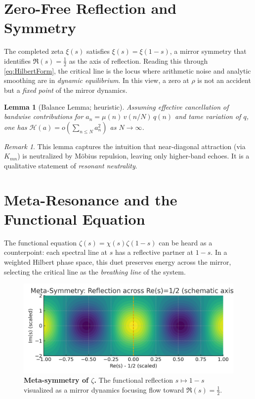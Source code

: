 \documentclass[11pt]{article}
\newtheorem{lemma}{Lemma}
\theoremstyle{remark}
\newtheorem{remark}{Remark}
\begin{document}
\section{Zero-Free Reflection and Symmetry}
The completed zeta $\xi(s)$ satisfies $\xi(s)=\xi(1-s)$, a mirror symmetry that identifies $\Re(s)=\tfrac12$ as the axis of reflection.
Reading this through \eqref{eq:HilbertForm}, the critical line is the locus where arithmetic noise and analytic smoothing are in \emph{dynamic equilibrium}. In this view, a zero at $\rho$ is not an accident but a \emph{fixed point} of the mirror dynamics.

\begin{lemma}[Balance Lemma; heuristic]
Assuming effective cancellation of bandwise contributions for $a_n=\mu(n)\,v(n/N)\,q(n)$ and tame variation of $q$, one has $\mathcal{H}(a)=o\!\left(\sum_{n\le N}a_n^2\right)$ as $N\to\infty$.
\end{lemma}

\begin{remark}
This lemma captures the intuition that near-diagonal attraction (via $K_{mn}$) is neutralized by M\"obius repulsion, leaving only higher-band echoes. It is a qualitative statement of \emph{resonant neutrality}.
\end{remark}

\section{Meta-Resonance and the Functional Equation}
The functional equation $\zeta(s)=\chi(s)\zeta(1-s)$ can be heard as a counterpoint: each spectral line at $s$ has a reflective partner at $1-s$.
In a weighted Hilbert phase space, this duet preserves energy across the mirror, selecting the critical line as the \emph{breathing line} of the system.

\begin{figure}[t]
\centering
\includegraphics[width=.78\linewidth]{figures/zeta_reflection.png}
\caption{\textbf{Meta-symmetry of $\zeta$.} The functional reflection $s\mapsto 1-s$ visualized as a mirror dynamics focusing flow toward $\Re(s)=\tfrac12$.}
\label{fig:reflection}
\end{figure}
\end{document}
